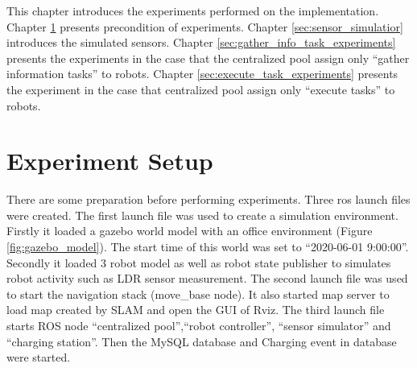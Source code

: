 This chapter introduces the experiments performed on the implementation. 
Chapter \ref{sec:experiment_set_up} presents precondition of experiments.
Chapter \ref{sec:sensor_simulatior} introduces the simulated sensors.
Chapter \ref{sec:gather_info_task_experiments} presents the experiments in the case that the centralized pool assign only ``gather information tasks'' to robots.
Chapter \ref{sec:execute_task_experiments} presents the experiment in the case that centralized pool assign only ``execute tasks'' to robots. 


\section{Experiment Setup}
\label{sec:experiment_set_up}
There are some preparation before performing experiments. Three ros launch files were created. The first launch file was used to create a simulation environment. Firstly it loaded a gazebo world model with an office environment (Figure \ref{fig:gazebo_model}). The start time of this world was set to ``2020-06-01 9:00:00''. Secondly it loaded 3 robot model as well as robot state publisher to simulates robot activity such as LDR sensor measurement.
The second launch file was used to start the navigation stack (move\_base node). It also started map server to load map created by SLAM\cite{T3SLAM} and open the GUI of Rviz. The third launch file starts ROS node ``centralized pool'',``robot controller'', ``sensor simulator'' and ``charging station''. Then the MySQL database and Charging event in database were started.


